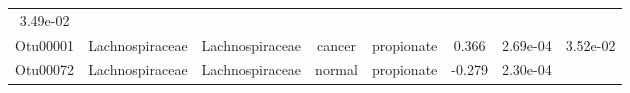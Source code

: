 \documentclass[11pt,]{article}
\begin{document}
\begin{longtable}[]{@{}cccccccc@{}}
\begin{minipage}[t]{0.08\columnwidth}
3.49e-02\strut
\end{minipage}\tabularnewline
\begin{minipage}[t]{0.08\columnwidth}\centering\strut
Otu00001\strut
\end{minipage} & \begin{minipage}[t]{0.15\columnwidth}\centering\strut
Lachnospiraceae\strut
\end{minipage} & \begin{minipage}[t]{0.15\columnwidth}\centering\strut
Lachnospiraceae\strut
\end{minipage} & \begin{minipage}[t]{0.08\columnwidth}\centering\strut
cancer\strut
\end{minipage} & \begin{minipage}[t]{0.09\columnwidth}\centering\strut
propionate\strut
\end{minipage} & \begin{minipage}[t]{0.07\columnwidth}\centering\strut
0.366\strut
\end{minipage} & \begin{minipage}[t]{0.08\columnwidth}\centering\strut
2.69e-04\strut
\end{minipage} & \begin{minipage}[t]{0.08\columnwidth}\centering\strut
3.52e-02\strut
\end{minipage}\tabularnewline
\begin{minipage}[t]{0.08\columnwidth}\centering\strut
Otu00072\strut
\end{minipage} & \begin{minipage}[t]{0.15\columnwidth}\centering\strut
Lachnospiraceae\strut
\end{minipage} & \begin{minipage}[t]{0.15\columnwidth}\centering\strut
Lachnospiraceae\strut
\end{minipage} & \begin{minipage}[t]{0.08\columnwidth}\centering\strut
normal\strut
\end{minipage} & \begin{minipage}[t]{0.09\columnwidth}\centering\strut
propionate\strut
\end{minipage} & \begin{minipage}[t]{0.07\columnwidth}\centering\strut
-0.279\strut
\end{minipage} & \begin{minipage}[t]{0.08\columnwidth}\centering\strut
2.30e-04\strut
\end{minipage} & \begin{minipage}[t]{0.08\columnwidth}\centering\strut

\end{minipage}
\end{longtable}
\end{document}
